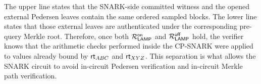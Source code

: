 The upper line states that the SNARK-side committed witness and the opened
external Pedersen leaves contain the same ordered sampled blocks.  The lower
line states that those external leaves are authenticated under the corresponding
pre-query Merkle root.  Therefore, once both
\({\mathcal{R}}_{\mathsf{LAMP}}^{\mathsf{on}}\) and
\({\mathcal{R}}_{\mathsf{LAMP}}^{\mathsf{off}}\) hold, the verifier knows that the
arithmetic checks performed inside the CP-SNARK were applied to values already
bound by \(\textsf{rt}_{ABC}\) and \(\textsf{rt}_{XYZ}\).  This separation is what allows the SNARK circuit to avoid in-circuit Pedersen verification and in-circuit Merkle path verification.






